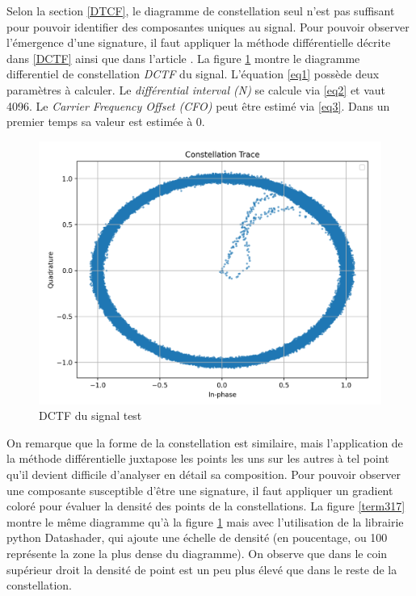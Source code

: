 Selon la section \ref{DTCF}, le diagramme de constellation seul n'est pas suffisant pour pouvoir identifier des composantes uniques au signal. Pour pouvoir observer l'émergence d'une signature, il faut appliquer la méthode différentielle décrite dans \ref{DCTF} ainsi que dans l'article \cite{loraDCTF}. La figure \ref{term316} montre le diagramme differentiel de constellation \textit{DCTF} du signal. L'équation \ref{eq1} possède deux paramètres à calculer. Le \textit{différential interval (N)} se calcule via \ref{eq2} et vaut 4096. Le \textit{Carrier Frequency Offset (CFO)} peut être estimé via \ref{eq3}. Dans un premier temps sa valeur est estimée à 0.

\begin{figure}[h]
\centering

\includegraphics[scale=0.25]{images/dctf3.png}
\caption{DCTF du signal test}\label{term316}
\end{figure}

On remarque que la forme de la constellation est similaire, mais l'application de la méthode différentielle juxtapose les points les uns sur les autres à tel point qu'il devient difficile d'analyser en détail sa composition. Pour pouvoir observer une composante susceptible d'être une signature, il faut appliquer un gradient coloré pour évaluer la densité des points de la constellations. La figure \ref{term317} montre le même diagramme qu'à la figure \ref{term316} mais avec l'utilisation de la librairie python Datashader, qui ajoute une échelle de densité (en poucentage, ou 100 représente la zone la plus dense du diagramme). On observe que dans le coin supérieur droit la densité de point est un peu plus élevé que dans le reste de la constellation.

